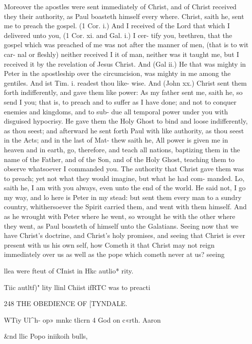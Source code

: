 \documentclass{custom}
\begin{document}
{Moreover the apostles were sent immediately of Christ, 
and of Christ received they their authority, as Paul boasteth 
himself every where. Christ, saith he, sent me to preach 
the gospel. (1 Cor. i.) And I received of the Lord that 
which I delivered unto you, (1 Cor. xi. and Gal. i.) I cer- 
tify you, brethren, that the gospel which was preached of 
me was not after the manner of men, (that is to wit car- 
nal or fleshly) neither received I it of man, neither was 
it taught me, but I received it by the revelation of Jesus 
Christ. And (Gal ii.) He that was mighty in Peter in the 
apostleship over the circumcision, was mighty in me 
among the gentiles. And ist Tim. i. readest thou like- 
wise. And (John xx.) Christ sent them forth indifferently, 
and gave them like power: As my father sent me, saith he, 
so send I you; that is, to preach and to suffer as I have 
done; and not to conquer enemies and kingdoms, and to sub- 
due all temporal power under you with disguised hypocrisy. 
He gave them the Holy Ghost to bind and loose indifferently, 
as thou seest; and afterward he sent forth Paul with like 
authority, as thou seest in the Acts; and in the last of Mat- 
thew saith he, All power is given me in heaven and in 
earth, go, therefore, and teach all nations, baptizing them in 
the name of the Father, and of the Son, and of the Holy 
Ghost, teaching them to observe whatsoever I commanded 
you. The authority that Christ gave them was to preach; 
yet not what they would imagine, but what he had com- 
manded. Lo, saith he, I am with you always, even unto 
the end of the world. He said not, I go my way, and lo here 
is Peter in my stead: but sent them every man to a sundry 
country, whithersoever the Spirit carried them, and went 
with them himself. And as he wrought with Peter where 
he went, so wrought he with the other where they went, 
as Paul boasteth of himself unto the Galatians. Seeing now 
that we have Christ's doctrine, and Christ's holy promises, 
and seeing that Christ is ever present with us his own self, 
how Cometh it that Christ may not reign immediately over 
us as well as the pope which cometh never at us? seeing 

llea were 
fteut of 
CInist in 
Hkc autlio* 
rity. 

Tiic autltf)" 
lity llinl 
Chiist ifRTC 
was to 
preacti 


248
THE OBEDIENCE OF
[TYNDALE.

WTiy Ul^h- 
op» mnkc 
tlicrn 4 God 
on c«rth. 
Aaron 

&nd llic 
Popo 
iniikoih 
bulls, 

}
\end{document}
